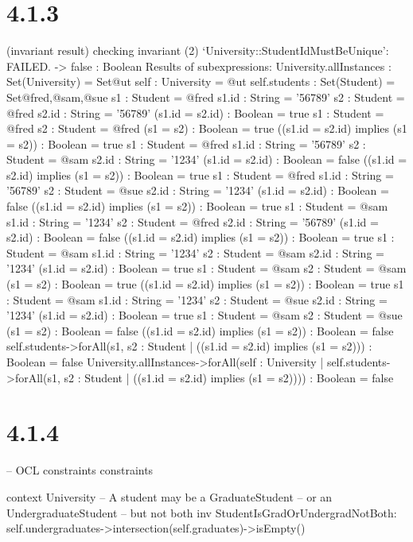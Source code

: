 \documentclass{article}
\begin{document}
	\section*{4.1.3}
	(invariant result)
	checking invariant (2) `University::StudentIdMustBeUnique': FAILED.
  -> false : Boolean
Results of subexpressions:
  University.allInstances : Set(University) = Set{@ut}
  self : University = @ut
  self.students : Set(Student) = Set{@fred,@sam,@sue}
  s1 : Student = @fred
  s1.id : String = '56789'
  s2 : Student = @fred
  s2.id : String = '56789'
  (s1.id = s2.id) : Boolean = true
  s1 : Student = @fred
  s2 : Student = @fred
  (s1 = s2) : Boolean = true
  ((s1.id = s2.id) implies (s1 = s2)) : Boolean = true
  s1 : Student = @fred
  s1.id : String = '56789'
  s2 : Student = @sam
  s2.id : String = '1234'
  (s1.id = s2.id) : Boolean = false
  ((s1.id = s2.id) implies (s1 = s2)) : Boolean = true
  s1 : Student = @fred
  s1.id : String = '56789'
  s2 : Student = @sue
  s2.id : String = '1234'
  (s1.id = s2.id) : Boolean = false
  ((s1.id = s2.id) implies (s1 = s2)) : Boolean = true
  s1 : Student = @sam
  s1.id : String = '1234'
  s2 : Student = @fred
  s2.id : String = '56789'
  (s1.id = s2.id) : Boolean = false
  ((s1.id = s2.id) implies (s1 = s2)) : Boolean = true
  s1 : Student = @sam
  s1.id : String = '1234'
  s2 : Student = @sam
  s2.id : String = '1234'
  (s1.id = s2.id) : Boolean = true
  s1 : Student = @sam
  s2 : Student = @sam
  (s1 = s2) : Boolean = true
  ((s1.id = s2.id) implies (s1 = s2)) : Boolean = true
  s1 : Student = @sam
  s1.id : String = '1234'
  s2 : Student = @sue
  s2.id : String = '1234'
  (s1.id = s2.id) : Boolean = true
  s1 : Student = @sam
  s2 : Student = @sue
  (s1 = s2) : Boolean = false
  ((s1.id = s2.id) implies (s1 = s2)) : Boolean = false
  self.students->forAll(s1, s2 : Student | ((s1.id = s2.id) implies (s1 = s2))) : Boolean = false
  University.allInstances->forAll(self : University | self.students->forAll(s1, s2 : Student | ((s1.id = s2.id) implies (s1 = s2)))) : Boolean = false

\section*{4.1.4}
  -- OCL constraints
constraints

context University
    -- A student may be a GraduateStudent
	-- or an UndergraduateStudent
    -- but not both
    inv StudentIsGradOrUndergradNotBoth:
       self.undergraduates->intersection(self.graduates)->isEmpty()
\end{document}
